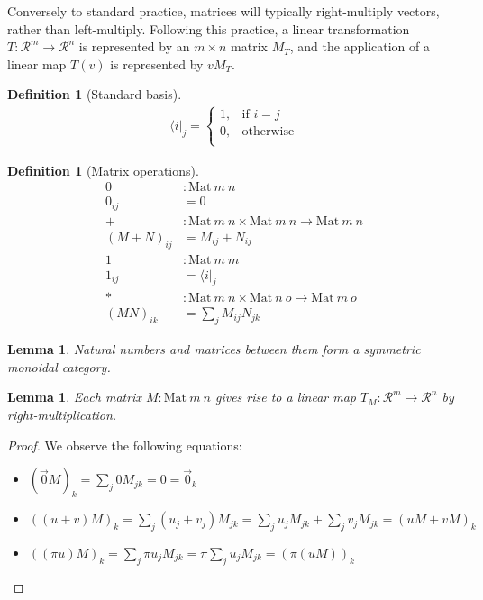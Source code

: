 \documentclass[submission,copyright,creativecommons]{eptcs}
\newtheorem{lemma}[theorem]{Lemma}
\newtheorem{definition}[theorem]{Definition}
\begin{document}
Conversely to standard practice, matrices will typically right-multiply vectors,
rather than left-multiply.
Following this practice, a linear transformation
$T : \mathscr R^m \to \mathscr R^n$ is represented by an $m \times n$ matrix
$M_T$, and the application of a linear map $T(v)$ is represented by $vM_T$.

\begin{definition}[Standard basis]
  \begin{align*}
    \langle i \rvert_j =
    \begin{cases}
      1, & \textrm{if }i = j \\
      0, & \textrm{otherwise} \\
    \end{cases}
  \end{align*}
\end{definition}

\begin{definition}[Matrix operations]
    \begin{align*}
      0 &: \mathrm{Mat}~m~n \\
      0_{ij} &= 0 \\
      + &: \mathrm{Mat}~m~n \times \mathrm{Mat}~m~n \to \mathrm{Mat}~m~n \\
      (M + N)_{ij} &= M_{ij} + N_{ij} \\
      1 &: \mathrm{Mat}~m~m \\
      1_{ij} &= \langle i \rvert_j \\
      * &: \mathrm{Mat}~m~n \times \mathrm{Mat}~n~o \to \mathrm{Mat}~m~o \\
      (MN)_{ik} &= \sum_j M_{ij}N_{jk}
    \end{align*}
\end{definition}

\begin{lemma}
  Natural numbers and matrices between them form a symmetric monoidal category.
\end{lemma}

\begin{lemma}
  Each matrix $M : \mathrm{Mat}~m~n$ gives rise to a linear map
  $T_M : \mathscr R^m \to \mathscr R^n$ by right-multiplication.
\end{lemma}
\begin{proof}
  We observe the following equations:
  \begin{itemize}
  \item $\left(\vec 0M\right)_{k} = \sum_j 0M_{jk} = 0 = \vec 0_{k}$
  \item $\left((u + v)M\right)_{k} = \sum_j \left(u_j + v_j\right)M_{jk} =
    \sum_j u_jM_{jk} + \sum_j v_jM_{jk} = (uM + vM)_{k}$
  \item $\left((\pi u)M\right)_{k} = \sum_j \pi u_jM_{jk} =
    \pi\sum_j u_jM_{jk} = \left(\pi(uM)\right)_{k}$
  \end{itemize}
\end{proof}
\end{document}
